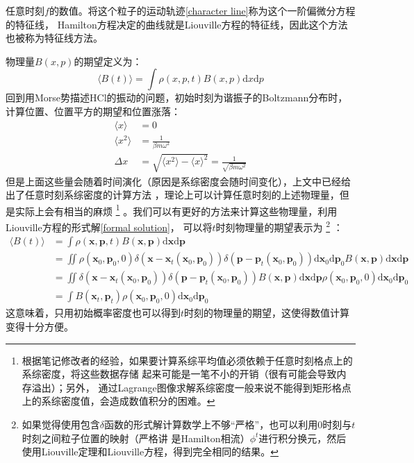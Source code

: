     任意时刻$f$的数值。将这个粒子的运动轨迹\ref{character line}称为这个一阶偏微分方程的特征线，
    Hamilton方程决定的曲线就是Liouville方程的特征线，因此这个方法也被称为特征线方法。
    \par
    物理量$B(x, p)$的期望定义为：
    \begin{equation}
        \langle B(t) \rangle = \int \rho(x,p,t) B(x,p) \mathrm{d}x\mathrm{d}p
    \end{equation}
    回到用Morse势描述HCl的振动的问题，初始时刻为谐振子的Boltzmann分布时，计算位置、位置平方的期望和位置涨落：
    \begin{equation}
        \begin{split}
            \langle x \rangle &= 0\\
            \langle x^2 \rangle &= \frac 1{\beta m \omega^2}\\
            \Delta x &= \sqrt{\langle x^2 \rangle - \langle x \rangle ^2} = \frac 1{\sqrt{\beta m \omega^2}}
        \end{split}
    \end{equation}
    但是上面这些量会随着时间演化（原因是系综密度会随时间变化），上文中已经给出了任意时刻系综密度的计算方法
    ，理论上可以计算任意时刻的上述物理量，但是实际上会有相当的麻烦
    \footnote{
        根据笔记修改者的经验，如果要计算系综平均值必须依赖于任意时刻格点上的系综密度，将这些数据存储
        起来可能是一笔不小的开销（很有可能会导致内存溢出）；另外，
        通过Lagrange图像求解系综密度一般来说不能得到矩形格点上的系综密度值，会造成数值积分的困难。
    }
    。我们可以有更好的方法来计算这些物理量，利用Liouville方程的形式解\ref{formal solution}，
    可以将$t$时刻物理量的期望表示为
    \footnote{
        如果觉得使用包含$\delta$函数的形式解计算数学上不够“严格”，也可以利用0时刻与$t$时刻之间粒子位置的映射（严格讲
        是Hamilton相流）$\phi^t$进行积分换元，然后使用Liouville定理和Liouville方程，得到完全相同的结果。
    }
    ：
    \begin{equation}
        \begin{split}
            \langle B(t) \rangle &= \int \rho(\bm{x},\bm{p},t) B(\bm{x},\bm{p}) \mathrm{d}\bm{x}\mathrm{d}\bm{p}\\
            &= \iint \rho(\bm{x}_0,\bm{p}_0,0)\delta(\bm{x}-\bm{x}_t(\bm{x}_0,\bm{p}_0)) \delta(\bm{p}-\bm{p}_t(\bm{x}_0,\bm{p}_0)) \mathrm{d}\bm{x}_0\mathrm{d}\bm{p}_0 B(\bm{x},\bm{p}) \mathrm{d}\bm{x}\mathrm{d}\bm{p}\\
            &= \iint \delta(\bm{x}-\bm{x}_t(\bm{x}_0,\bm{p}_0)) \delta(\bm{p}-\bm{p}_t(\bm{x}_0,\bm{p}_0)) B(\bm{x},\bm{p}) \mathrm{d}\bm{x}\mathrm{d}\bm{p} \rho(\bm{x}_0,\bm{p}_0,0) \mathrm{d}\bm{x}_0\mathrm{d}\bm{p}_0\\
            &= \int B(\bm{x}_t,\bm{p}_t) \rho(\bm{x}_0,\bm{p}_0,0)\mathrm{d}\bm{x}_0\mathrm{d}\bm{p}_0
        \end{split}
    \end{equation}
    这意味着，只用初始概率密度也可以得到$t$时刻的物理量的期望，这使得数值计算变得十分方便。

